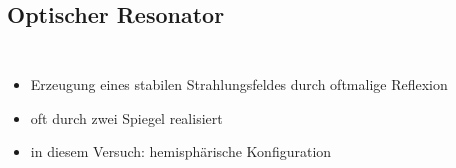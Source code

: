 \documentclass[10pt, aspectratio=169]{beamer}
\begin{document}
\subsection{Optischer Resonator}
\label{sec:reso}

\begin{frame}
  \begin{columns}
      
    \begin{itemize}
    \item<1-> Erzeugung eines stabilen Strahlungsfeldes durch
      oftmalige Reflexion
    \item<2-> oft durch zwei Spiegel realisiert
    \item<2-> in diesem Versuch: hemisph\"arische Konfiguration
    \end{itemize}
  \end{columns}
\end{frame}
\end{document}

